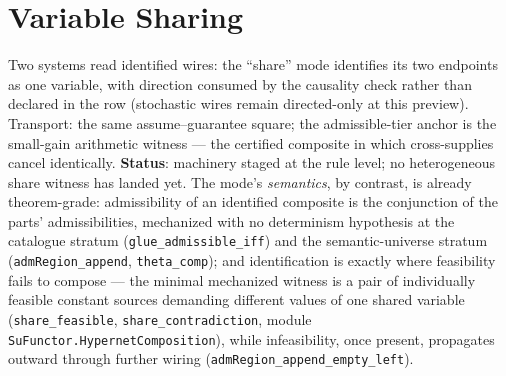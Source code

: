 

\section{Variable Sharing}
\label{sec:cp-share}

Two systems read identified wires: the ``share'' mode identifies its
two endpoints as one variable, with direction consumed by the
causality check rather than declared in the row (stochastic wires
remain directed-only at this preview). Transport: the same
assume--guarantee square; the admissible-tier anchor is the small-gain
arithmetic witness --- the certified composite in which cross-supplies
cancel identically. \textbf{Status}: machinery staged at the rule
level; no heterogeneous share witness has landed yet. The mode's
\emph{semantics}, by contrast, is already theorem-grade: admissibility
of an identified composite is the conjunction of the parts'
admissibilities, mechanized with no determinism hypothesis at the
catalogue stratum (\texttt{glue\_admissible\_iff}) and the
semantic-universe stratum (\texttt{admRegion\_append},
\texttt{theta\_comp}); and identification is exactly where feasibility
fails to compose --- the minimal mechanized witness is a pair of
individually feasible constant sources demanding different values of
one shared variable (\texttt{share\_feasible},
\texttt{share\_contradiction}, module
\texttt{SuFunctor.HypernetComposition}), while infeasibility, once
present, propagates outward through further wiring
(\texttt{admRegion\_append\_empty\_left}).

